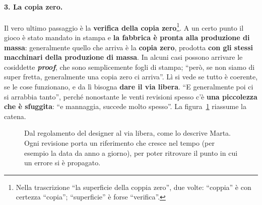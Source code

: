 \paragraph{3. La copia zero.} Il vero ultimo passaggio è la \textbf{verifica della copia
zero}\footnote{Nella trascrizione ``la superficie della coppia zero'', due volte: ``coppia'' è
con certezza ``copia''; ``superficie'' è forse ``verifica''.}. A un certo punto il gioco è
stato mandato in stampa e \textbf{la fabbrica è pronta alla produzione di massa}:
generalmente quello che arriva è la \textbf{copia zero}, prodotta \textbf{con gli stessi
macchinari della produzione di massa}. In alcuni casi possono arrivare le cosiddette
\textbf{\emph{proof}}, che sono semplicemente fogli di stampa; ``però, se non siamo di super
fretta, generalmente una copia zero ci arriva''. Lì si vede se tutto è coerente, se le cose
funzionano, e da lì bisogna \textbf{dare il via libera}. ``E generalmente poi ci si arrabbia
tanto'', perché nonostante le venti revisioni spesso c'è \textbf{una piccolezza che è
sfuggita}: ``e mannaggia, succede molto spesso''. La figura~\ref{a14:fig:revisioni} riassume
la catena.

\begin{figure}[htbp]
\centering
{}
\caption{Dal regolamento del designer al via libera, come lo descrive Marta. Ogni revisione
porta un riferimento che cresce nel tempo (per esempio la data da anno a giorno), per poter
ritrovare il punto in cui un errore si è propagato.}
\label{a14:fig:revisioni}
\end{figure}

